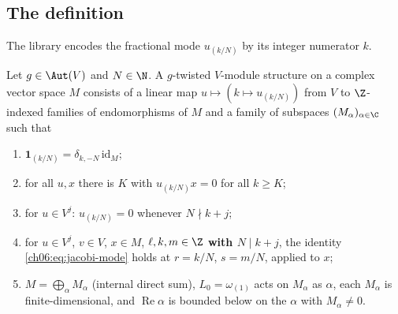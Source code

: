 \subsection{The definition}

The library encodes the fractional mode $u_{(k/N)}$ by its integer numerator $k$.

\begin{definition}\label{ch06:def:tm}
Let $g\in\Aut(V)$ and $N\in\N$.  A $g$-twisted $V$-module structure on a complex vector space
$M$ consists of a linear map $u\mapsto(k\mapsto u_{(k/N)})$ from $V$ to $\Z$-indexed families of
endomorphisms of $M$ and a family of subspaces $(M_\alpha)_{\alpha\in\C}$ such that
\begin{enumerate}[label=(\roman*)]
\item $\mathbf 1_{(k/N)}=\delta_{k,-N}\,\mathrm{id}_M$;
\item for all $u,x$ there is $K$ with $u_{(k/N)}x=0$ for all $k\ge K$;
\item for $u\in V^j$: $u_{(k/N)}=0$ whenever $N\nmid k+j$;
\item for $u\in V^j$, $v\in V$, $x\in M$, $\ell,k,m\in\Z$ \textbf{with $N\mid k+j$}, the identity
  \eqref{ch06:eq:jacobi-mode} holds at $r=k/N$, $s=m/N$, applied to $x$;
\item $M=\bigoplus_\alpha M_\alpha$ (internal direct sum), $L_0=\omega_{(1)}$ acts on $M_\alpha$ as
  $\alpha$, each $M_\alpha$ is finite-dimensional, and $\operatorname{Re}\alpha$ is bounded below on
  the $\alpha$ with $M_\alpha\ne0$.
\end{enumerate}
\end{definition}


